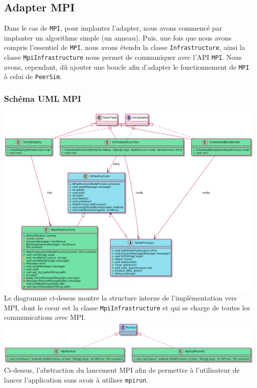 \documentclass{article}
\begin{document}
			\newpage
			\subsection{Adapter MPI}
			Dans le cas de \verb|MPI|, pour implanter l'adapter, nous avons commencé par implanter un algorithme simple (un anneau). Puis, une fois que nous avons compris l'essentiel de \verb|MPI|, nous avons étendu la classe \verb|Infrastructure|, ainsi la classe \verb|MpiInfrastructure| nous permet de communiquer avec l'API \verb|MPI|. 
			Nous avons, cependant, dû ajouter une boucle afin d'adapter le fonctionnement de \verb|MPI| à celui de \verb|PeerSim|.
				\subsubsection{Schéma UML MPI}
				\vspace{1mm}
				\hspace*{-2.1cm} \includegraphics[width=19.5cm]{uml/mpi1.png}
				Le diagramme ci-dessus montre la structure interne de l'implémentation vers MPI, dont le cœur est la classe \verb|MpiInfrastructure|
				et qui se charge de toutes les communications avec MPI.
				\hspace*{-2.3cm} \includegraphics[width=20cm]{uml/mpi2.png}
				Ci-dessus, l'abstraction du lancement MPI afin de permettre à l'utilisateur de lancer l'application sans avoir à utiliser \verb|mpirun|.
\end{document}
